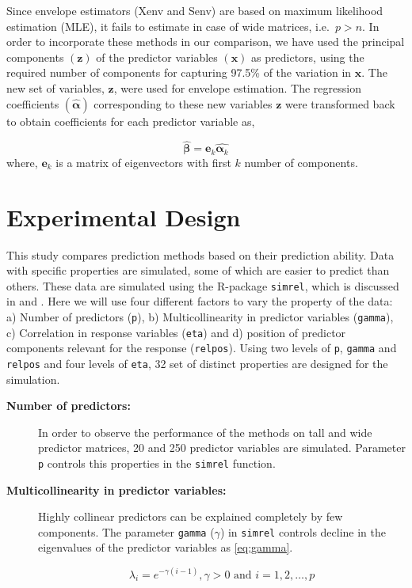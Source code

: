 \documentclass[12pt,3p,authoryear]{elsarticle}
\begin{document}
Since envelope estimators (Xenv and Senv) are based on maximum
likelihood estimation (MLE), it fails to estimate in case of wide
matrices, i.e.~\(p > n\). In order to incorporate these methods in our
comparison, we have used the principal components \((\mathbf{z})\) of
the predictor variables \((\mathbf{x})\) as predictors, using the
required number of components for capturing 97.5\% of the variation in
\(\mathbf{x}\). The new set of variables, \(\mathbf{z}\), were used for
envelope estimation. The regression coefficients
\((\hat{\boldsymbol{\alpha}})\) corresponding to these new variables
\(\mathbf{z}\) were transformed back to obtain coefficients for each
predictor variable as,

\[\hat{\boldsymbol{\beta}} = \mathbf{e}_k\hat{\boldsymbol{\alpha}_k}\]
where, \(\mathbf{e}_k\) is a matrix of eigenvectors with first \(k\)
number of components.

\hypertarget{experimental-design}{%
\section{Experimental Design}\label{experimental-design}}

This study compares prediction methods based on their prediction
ability. Data with specific properties are simulated, some of which are
easier to predict than others. These data are simulated using the
R-package \texttt{simrel}, which is discussed in \citet{saebo2015simrel}
and \citet{Rimal2018}. Here we will use four different factors to vary
the property of the data: a) Number of predictors (\texttt{p}), b)
Multicollinearity in predictor variables (\texttt{gamma}), c)
Correlation in response variables (\texttt{eta}) and d) position of
predictor components relevant for the response (\texttt{relpos}). Using
two levels of \texttt{p}, \texttt{gamma} and \texttt{relpos} and four
levels of \texttt{eta}, 32 set of distinct properties are designed for
the simulation.

\begin{description}
\item[\textbf{Number of predictors:}]
In order to observe the performance of the methods on tall and wide
predictor matrices, 20 and 250 predictor variables are simulated.
Parameter \texttt{p} controls this properties in the \texttt{simrel}
function.
\item[\textbf{Multicollinearity in predictor variables:}]
Highly collinear predictors can be explained completely by few
components. The parameter \texttt{gamma} (\(\gamma\)) in \texttt{simrel}
controls decline in the eigenvalues of the predictor variables as
\eqref{eq:gamma}.

\begin{equation}
  \lambda_i = e^{-\gamma(i - 1)}, \gamma > 0 \text{ and } i = 1, 2, \ldots, p
  \label{eq:gamma}
\end{equation}
\end{description}
\end{document}
